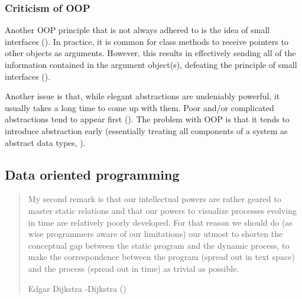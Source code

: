 \documentclass[
]{book}
\theoremstyle{definition}
\theoremstyle{definition}
\theoremstyle{definition}
\theoremstyle{definition}
\theoremstyle{remark}
\begin{document}
\subsubsection{Criticism of OOP}\label{criticism-of-oop}

Another OOP principle that is not always adhered to is the idea of small interfaces (). In practice, it is common for class methods to receive pointers to other objects as arguments. However, this results in effectively sending all of the information contained in the argument object(s), defeating the principle of small interfaces ().

Another issue is that, while elegant abstractions are undeniably powerful, it usually takes a long time to come up with them. Poor and/or complicated abstractions tend to appear first (). The problem with OOP is that it tends to introduce abstraction early (essentially treating all components of a system as abstract data types, ).

\subsection{Data oriented programming}\label{data-oriented-programming}

\begin{quote}
My second remark is that our intellectual powers are rather geared to master static relations and that our powers to visualize processes evolving in time are relatively poorly developed. For that reason we should do (as wise programmers aware of our limitations) our utmost to shorten the conceptual gap between the static program and the dynamic process, to make the correspondence between the program (spread out in text space) and the process (spread out in time) as trivial as possible.

Edgar Dijkstra -Dijkstra ()
\end{quote}
\end{document}
